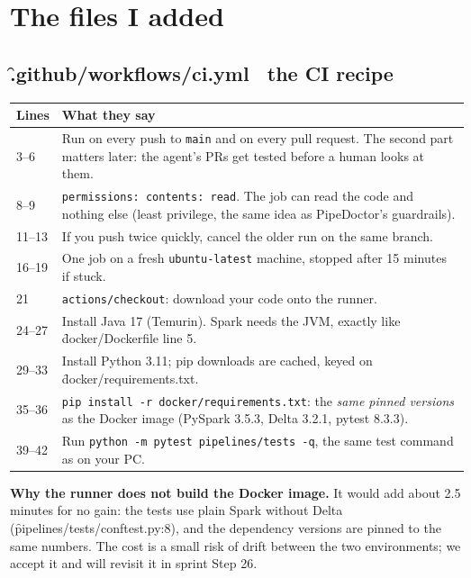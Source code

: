 \documentclass[11pt,a4paper]{article}
\let\oldsection\section
\renewcommand{\section}{\Needspace*{9\baselineskip}\oldsection}
\begin{document}
\section{The files I added}
\subsection*{\f{.github/workflows/ci.yml} \textemdash\ the CI recipe}
\begin{tabularx}{\textwidth}{@{}>{\ttfamily\footnotesize}p{1.6cm}X@{}}
\toprule
Lines & What they say \\
\midrule
3--6 & Run on every push to \texttt{main} and on every pull request. The second part matters later: the agent's PRs get tested before a human looks at them. \\
8--9 & \texttt{permissions: contents: read}. The job can read the code and nothing else (least privilege, the same idea as PipeDoctor's guardrails). \\
11--13 & If you push twice quickly, cancel the older run on the same branch. \\
16--19 & One job on a fresh \texttt{ubuntu-latest} machine, stopped after 15 minutes if stuck. \\
21 & \texttt{actions/checkout}: download your code onto the runner. \\
24--27 & Install Java 17 (Temurin). Spark needs the JVM, exactly like \f{docker/Dockerfile} line 5. \\
29--33 & Install Python 3.11; pip downloads are cached, keyed on \f{docker/requirements.txt}. \\
35--36 & \texttt{pip install -r docker/requirements.txt}: the \emph{same pinned versions} as the Docker image (PySpark 3.5.3, Delta 3.2.1, pytest 8.3.3). \\
39--42 & Run \texttt{python -m pytest pipelines/tests -q}, the same test command as on your PC. \\
\bottomrule
\end{tabularx}

\medskip
\textbf{Why the runner does not build the Docker image.} It would add about 2.5 minutes for no gain: the tests use plain Spark without Delta (\f{pipelines/tests/conftest.py:8}), and the dependency versions are pinned to the same numbers. The cost is a small risk of drift between the two environments; we accept it and will revisit it in sprint Step 26.
\end{document}
